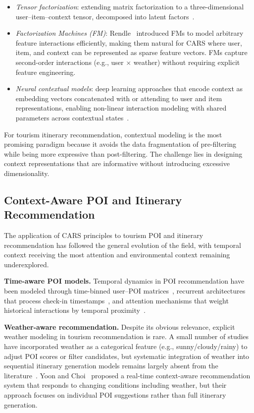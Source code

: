 \begin{itemize}
  \item \emph{Tensor factorization}: extending matrix factorization to a three-dimensional user--item--context tensor, decomposed into latent factors~\cite{adomavicius2005cars}.
  \item \emph{Factorization Machines (FM)}: Rendle~\cite{rendle2010fm} introduced FMs to model arbitrary feature interactions efficiently, making them natural for CARS where user, item, and context can be represented as sparse feature vectors. FMs capture second-order interactions (e.g., user $\times$ weather) without requiring explicit feature engineering.
  \item \emph{Neural contextual models}: deep learning approaches that encode context as embedding vectors concatenated with or attending to user and item representations, enabling non-linear interaction modeling with shared parameters across contextual states~\cite{mateos2025carsslr}.
\end{itemize}

For tourism itinerary recommendation, contextual modeling is the most promising paradigm because it avoids the data fragmentation of pre-filtering while being more expressive than post-filtering. The challenge lies in designing context representations that are informative without introducing excessive dimensionality.

\subsection{Context-Aware POI and Itinerary Recommendation}
\label{sec:sota-cars-tourism}

The application of CARS principles to tourism POI and itinerary recommendation has followed the general evolution of the field, with temporal context receiving the most attention and environmental context remaining underexplored.

\textbf{Time-aware POI models.} Temporal dynamics in POI recommendation have been modeled through time-binned user--POI matrices~\cite{zhang2014timepoi}, recurrent architectures that process check-in timestamps~\cite{zhao2016stellar}, and attention mechanisms that weight historical interactions by temporal proximity~\cite{huang2024timeslot}.

\textbf{Weather-aware recommendation.} Despite its obvious relevance, explicit weather modeling in tourism recommendation is rare. A small number of studies have incorporated weather as a categorical feature (e.g., sunny/cloudy/rainy) to adjust POI scores or filter candidates, but systematic integration of weather into sequential itinerary generation models remains largely absent from the literature~\cite{villegas2018cars}. Yoon and Choi~\cite{yoon2023realtime} proposed a real-time context-aware recommendation system that responds to changing conditions including weather, but their approach focuses on individual POI suggestions rather than full itinerary generation.

